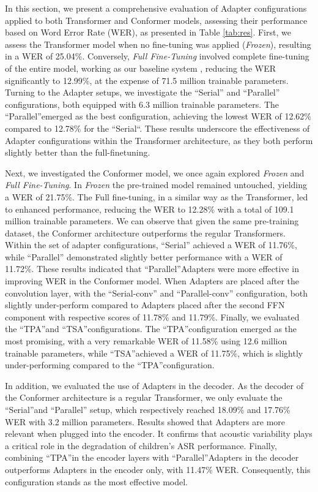 In this section, we present a comprehensive evaluation of Adapter configurations applied to both Transformer and Conformer models, assessing their performance based on Word Error Rate (WER), as presented in Table \ref{tab:res}.  First, we assess 
the Transformer model when no fine-tuning was applied (\textit{Frozen}), resulting in a WER of 25.04\%. Conversely, \textit{Full Fine-Tuning} involved complete fine-tuning of the entire model,
working as our baseline system
, reducing the WER significantly to 12.99\%, at the expense of 71.5 million trainable parameters.
Turning to the Adapter setups, we investigate the ``Serial'' and ``Parallel'' configurations, both equipped with 6.3 million trainable parameters. The ``Parallel''emerged as the best configuration, achieving the lowest WER of 12.62\% compared to 12.78\% for the ``Serial``. These results underscore the effectiveness of Adapter configurations within the Transformer architecture, as they both perform slightly better than the full-finetuning.

Next, we investigated the Conformer model, we once again explored \textit{Frozen} and \textit{Full Fine-Tuning}. In \textit{Frozen} the pre-trained model remained untouched, yielding a WER of 21.75\%. The Full fine-tuning, in a similar way as the Transformer, led to enhanced performance, reducing the WER to 12.28\% with a total of 109.1 million trainable parameters. We can observe that given the same pre-training dataset, the Conformer architecture outperforms the regular Transformers. Within the set of adapter configurations, ``Serial'' achieved a WER of 11.76\%, while ``Parallel'' demonstrated slightly better performance with a WER of 11.72\%. These results indicated that ``Parallel''Adapters were more effective in improving WER in the Conformer model. When Adapters are placed after the convolution layer, with the ``Serial-conv'' and ``Parallel-conv'' configuration, both slightly under-perform compared to Adapters placed after the second FFN component with respective scores of 11.78\% and 11.79\%. Finally, we evaluated the ``TPA''and ``TSA''configurations. The ``TPA''configuration emerged as the most promising, with a very remarkable WER of 11.58\% using 12.6 million trainable parameters, while ``TSA''achieved a WER of 11.75\%, which is slightly under-performing compared to the ``TPA''configuration.

In addition, we evaluated the use of  Adapters in the decoder. As the decoder of the Conformer architecture is a regular Transformer, we only evaluate the ``Serial''and ``Parallel'' setup, which respectively reached 18.09\%  and 17.76\% WER with 3.2 million parameters. Results showed that Adapters are more relevant when plugged into the encoder. It confirms that acoustic variability plays a critical role in the degradation of children's ASR performance. Finally, combining ``TPA''in the encoder layers with ``Parallel''Adapters in the decoder outperforms Adapters in the encoder only, with 11.47\% WER. Consequently, this configuration stands as the most effective model. 

